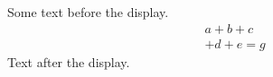 \documentclass[12pt]{article}
\begin{document}
Some text before the display.
\begin{multline*} a + b + c \\ + d + e = g \end{multline*}
Text after the display.
\end{document}
